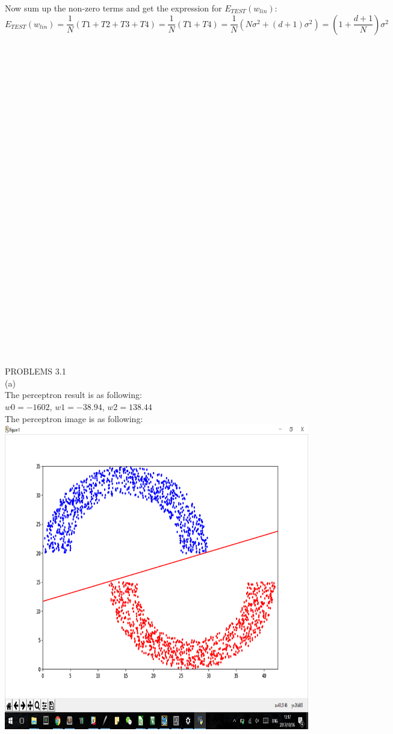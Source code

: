 \documentclass[12pt]{article}
\begin{document}
Now sum up the non-zero terms and get the expression for $E_{TEST}(w_{lin})$:
$$E_{TEST}(w_{lin})=\frac{1}{N}(T1+T2+T3+T4)=\frac{1}{N}(T1+T4)=\frac{1}{N}(N\sigma^2+(d+1)\sigma^2)=(1+\frac{d+1}{N})\sigma^2$$
\\\\\\\\\\\\\\\\\\\\\\\\\\\\\\\\\\\\\\\\\\\\\\\\\\\\\\\\
PROBLEMS
3.1\\%
(a)\\
The perceptron result is as following:
\\$w0=-1602$, $w1=-38.94$, $w2=138.44$\\
The perceptron image is as following:\\
\includegraphics[scale=0.8]{3-1a}\\
\end{document}
